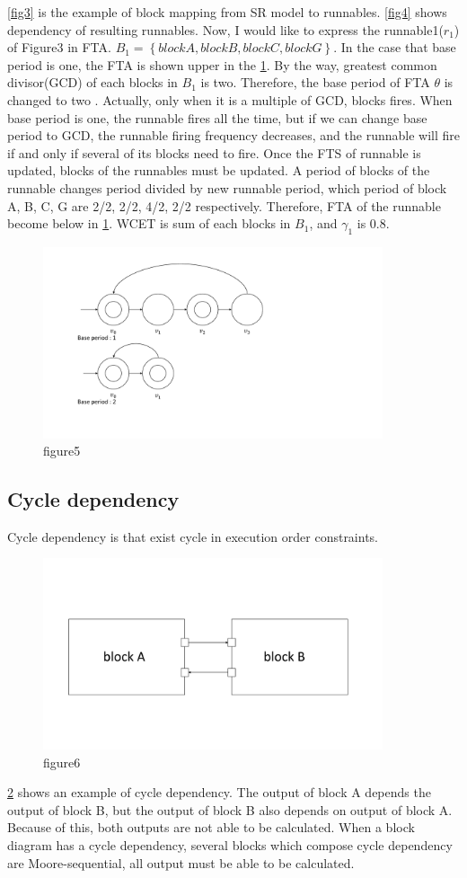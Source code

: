\documentclass[conference,compsoc]{IEEEtran}
\begin{document}
\ref{fig3} is the example of block mapping from SR model to runnables.
\ref{fig4} shows dependency of resulting runnables.
Now, I would like to express  the runnable1($r_1$) of Figure3 in FTA.
$B_1 = \left\{block A, block B, block C, block G\right\}$.
In the case that base period is one, the FTA is shown upper in the \ref{fig5}.
By the way, greatest common divisor(GCD) of each blocks in $B_1$ is two.
Therefore, the base period of FTA $\theta$ is changed to two .
Actually, only when it is a multiple of GCD, blocks fires.
When base period is one, the runnable fires all the time, but if we can change base period to GCD, the runnable firing frequency decreases, and the runnable will fire if and only if several of its blocks need to fire. 
 Once the FTS of runnable is updated, blocks of the runnables must be updated.
A period of blocks of the runnable changes period divided by new runnable period, which period of block A, B, C, G are 2/2, 2/2, 4/2, 2/2 respectively.
Therefore, FTA of the runnable become below in \ref{fig5}.  
 WCET is sum of each blocks in $B_1$, and $\gamma_1$ is 0.8.


\begin{figure}
	\centering
	\includegraphics[width=10cm,clip]{figure9.pdf}
	\caption{figure5}
	\label{fig5}
\end{figure}


\subsection{Cycle dependency}
 Cycle dependency is that exist cycle in execution order constraints.
\begin{figure}
	\centering
	\includegraphics[width=10cm,clip]{figure4.pdf}
	\caption{figure6}
	\label{fig6}
\end{figure}
 \ref{fig6} shows an example of cycle dependency.
The output of block A depends the output of block B, but the output of block B also depends on output of block A.
Because of this, both outputs are not able to be calculated.
When a block diagram has a cycle dependency, several blocks which compose cycle dependency are Moore-sequential, all output must be able to be calculated.
\end{document}
